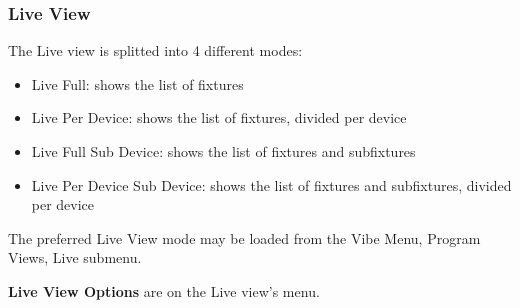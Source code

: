\documentclass[
]{article}
\begin{document}
\hypertarget{live-view}{%
\subsubsection{Live View}\label{live-view}}

The Live view is splitted into 4 different modes:

\begin{itemize}
\item
  Live Full: shows the list of fixtures
\item
  Live Per Device: shows the list of fixtures, divided per device
\item
  Live Full Sub Device: shows the list of fixtures and subfixtures
\item
  Live Per Device Sub Device: shows the list of fixtures and subfixtures, divided per device
\end{itemize}

The preferred Live View mode may be loaded from the Vibe Menu, Program Views, Live submenu.

\textbf{Live View Options} are on the Live view's menu.
\end{document}
